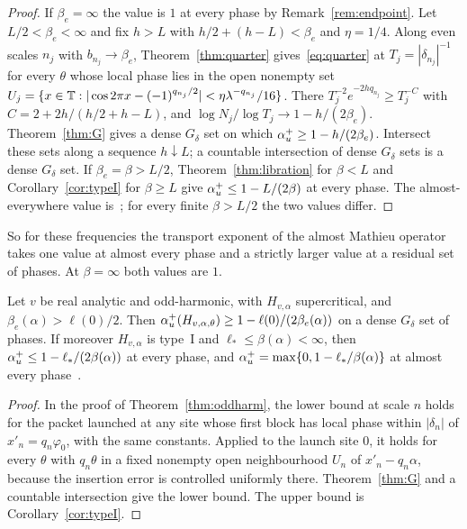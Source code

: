 \begin{proof}
If $\beta_e=\infty$ the value is $1$ at every phase by Remark~\ref{rem:endpoint}. Let $L/2<\beta_e<\infty$ and fix $h>L$ with $h/2+(h-L)<\beta_e$ and $\eta=1/4$. Along even scales $n_j$ with $b_{n_j}\to\beta_e$, Theorem~\ref{thm:quarter} gives~\eqref{eq:quarter} at $T_j=|\delta_{n_j}|^{-1}$ for every $\theta$ whose local phase lies in the open nonempty set $U_j=\{x\in\mathbb T:|\cos2\pi x-(-1)^{q_{n_j}/2}|<\eta\lambda^{-q_{n_j}}/16\}$. There $T_j^{-2}e^{-2hq_{n_j}}\ge T_j^{-C}$ with $C=2+2h/(h/2+h-L)$, and $\log N_j/\log T_j\to1-h/(2\beta_e)$. Theorem~\ref{thm:G} gives a dense $G_\delta$ set on which $\alpha_u^+\ge1-h/(2\beta_e)$. Intersect these sets along a sequence $h\downarrow L$; a countable intersection of dense $G_\delta$ sets is a dense $G_\delta$ set. If $\beta_e=\beta>L/2$, Theorem~\ref{thm:libration} for $\beta<L$ and Corollary~\ref{cor:typeI} for $\beta\ge L$ give $\alpha_u^+\le1-L/(2\beta)$ at every phase. The almost-everywhere value is~\cite[Theorem~A]{DMamo}; for every finite $\beta>L/2$ the two values differ.
\end{proof}

So for these frequencies the transport exponent of the almost Mathieu operator takes one value at almost every phase and a strictly larger value at a residual set of phases. At $\beta=\infty$ both values are $1$.

\begin{corollary}\label{cor:G2}
Let $v$ be real analytic and odd-harmonic, with $H_{v,\alpha}$ supercritical, and $\beta_e(\alpha)>\ell(0)/2$. Then $\alpha_u^+(H_{v,\alpha,\theta})\ge1-\ell(0)/(2\beta_e(\alpha))$ on a dense $G_\delta$ set of phases. If moreover $H_{v,\alpha}$ is type~I and $\ell_*\le\beta(\alpha)<\infty$, then $\alpha_u^+\le1-\ell_*/(2\beta(\alpha))$ at every phase, and $\alpha_u^+=\max\{0,1-\ell_*/\beta(\alpha)\}$ at almost every phase~\cite[Theorem~A]{DMuniv}.
\end{corollary}

\begin{proof}
In the proof of Theorem~\ref{thm:oddharm}, the lower bound at scale $n$ holds for the packet launched at any site whose first block has local phase within $|\delta_n|$ of $x'_n=q_n\varphi_0$, with the same constants. Applied to the launch site $0$, it holds for every $\theta$ with $q_n\theta$ in a fixed nonempty open neighbourhood $U_n$ of $x'_n-q_n\alpha$, because the insertion error is controlled uniformly there. Theorem~\ref{thm:G} and a countable intersection give the lower bound. The upper bound is Corollary~\ref{cor:typeI}.
\end{proof}

